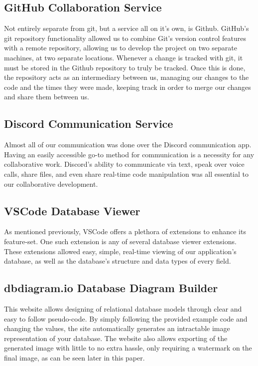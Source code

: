 \documentclass[sigconf]{acmart}
\begin{document}
\subsection{GitHub Collaboration Service}
Not entirely separate from git, but a service all on it's own, is Github. GitHub's git repository functionality allowed us to combine Git's version control features with a remote repository, allowing us to develop the project on two separate machines, at two separate locations. Whenever a change is tracked with git, it must be stored in the Github repository to truly be tracked. Once this is done, the repository acts as an intermediary between us, managing our changes to the code and the times they were made, keeping track in order to merge our changes and share them between us. 

\pagebreak
\subsection{Discord Communication Service}
Almost all of our communication was done over the Discord communication app. Having an easily accessible go-to method for communication is a necessity for any collaborative work. Discord's ability to communicate via text, speak over voice calls, share files, and even share real-time code manipulation was all essential to our collaborative development.

\subsection{VSCode Database Viewer}
As mentioned previously, VSCode offers a plethora of extensions to enhance its feature-set. One such extension is any of several database viewer extensions. These extensions allowed easy, simple, real-time viewing of our application's database, as well as the database's structure and data types of every field.

\subsection{dbdiagram.io Database Diagram Builder}
This website allows designing of relational database models through clear and easy to follow pseudo-code. By simply following the provided example code and changing the values, the site automatically generates an intractable image representation of your database. The website also allows exporting of the generated image with little to no extra hassle, only requiring a watermark on the final image, as can be seen later in this paper.
\end{document}

